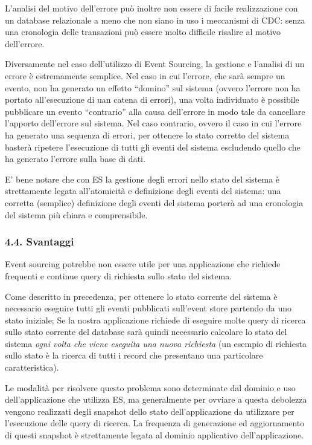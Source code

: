\documentclass[]{article}
\begin{document}
\newpage

L'analisi del motivo dell'errore può inoltre non essere di facile
realizzazione con un database relazionale a meno che non siano in uso i
meccanismi di CDC: senza una cronologia delle transazioni può essere
molto difficile risalire al motivo dell'errore.

Diversamente nel caso dell'utilizzo di Event Sourcing, la gestione e
l'analisi di un errore è estremamente semplice. Nel caso in cui
l'errore, che sarà sempre un evento, non ha generato un effetto
``domino'' sul sistema (ovvero l'errore non ha portato all'esecuzione di
uan catena di errori), una volta individuato è possibile pubblicare un
evento ``contrario'' alla causa dell'errore in modo tale da cancellare
l'apporto dell'errore sul sistema. Nel caso contrario, ovvero il caso in
cui l'errore ha generato una sequenza di errori, per ottenere lo stato
corretto del sistema basterà ripetere l'esecuzione di tutti gli eventi
del sistema escludendo quello che ha generato l'errore sulla base di
dati.

E' bene notare che con ES la gestione degli errori nello stato del
sistema è strettamente legata all'atomicità e definizione degli eventi
del sistema: una corretta (semplice) definizione degli eventi del
sistema porterà ad una cronologia del sistema più chiara e
comprensibile.

\subsubsection{4.4. Svantaggi}\label{svantaggi}

Event sourcing potrebbe non essere utile per una applicazione che
richiede frequenti e continue query di richiesta sullo stato del
sistema.

Come descritto in precedenza, per ottenere lo stato corrente del sistema
è necessario eseguire tutti gli eventi pubblicati sull'event store
partendo da uno stato iniziale; Se la nostra applicazione richiede di
eseguire molte query di ricerca sullo stato corrente del database sarà
quindi necessario calcolare lo stato del sistema \emph{ogni volta che
viene eseguita una nuova richiesta} (un esempio di richiesta sullo stato
è la ricerca di tutti i record che presentano una particolare
caratteristica).

Le modalità per risolvere questo problema sono determinate dal dominio e
uso dell'applicazione che utilizza ES, ma generalmente per ovviare a
questa debolezza vengono realizzati degli snapshot dello stato
dell'applicazione da utilizzare per l'esecuzione delle query di ricerca.
La frequenza di generazione ed aggiornamento di questi snapshot è
strettamente legata al dominio applicativo dell'applicazione.
\end{document}
